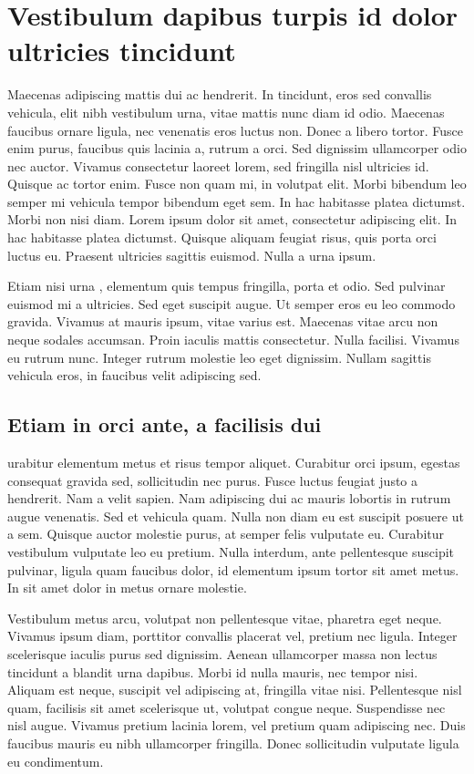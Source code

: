 \chapter{Vestibulum dapibus turpis id dolor ultricies tincidunt}

Maecenas adipiscing mattis dui ac hendrerit. In tincidunt, eros sed convallis vehicula, elit nibh vestibulum urna, vitae mattis nunc diam id odio. Maecenas faucibus ornare ligula, nec venenatis eros luctus non. Donec a libero tortor. Fusce enim purus, faucibus quis lacinia a, rutrum a orci. Sed dignissim ullamcorper odio nec auctor. Vivamus consectetur laoreet lorem, sed fringilla nisl ultricies id. Quisque ac tortor enim. Fusce non quam mi, in volutpat elit. Morbi bibendum leo semper mi vehicula tempor bibendum eget sem. In hac habitasse platea dictumst. Morbi non nisi diam. Lorem ipsum dolor sit amet, consectetur adipiscing elit. In hac habitasse platea dictumst. Quisque aliquam feugiat risus, quis porta orci luctus eu. Praesent ultricies sagittis euismod. Nulla a urna ipsum.

Etiam nisi urna \cite{doe2016}, elementum quis tempus fringilla, porta et odio. Sed pulvinar euismod mi a ultricies. Sed eget suscipit augue. Ut semper eros eu leo commodo gravida. Vivamus at mauris ipsum, vitae varius est. Maecenas vitae arcu non neque sodales accumsan. Proin iaculis mattis consectetur. Nulla facilisi. Vivamus eu rutrum nunc. Integer rutrum molestie leo eget dignissim. Nullam sagittis vehicula eros, in faucibus velit adipiscing sed.

\section{Etiam in orci ante, a facilisis dui}
urabitur elementum metus et risus tempor aliquet. Curabitur orci ipsum, egestas consequat gravida sed, sollicitudin nec purus. Fusce luctus feugiat justo a hendrerit. Nam a velit sapien. Nam adipiscing dui ac mauris lobortis in rutrum augue venenatis. Sed et vehicula quam. Nulla non diam eu est suscipit posuere ut a sem. Quisque auctor molestie purus, at semper felis vulputate eu. Curabitur vestibulum vulputate leo eu pretium. Nulla interdum, ante pellentesque suscipit pulvinar, ligula quam faucibus dolor, id elementum ipsum tortor sit amet metus. In sit amet dolor in metus ornare molestie.

Vestibulum metus arcu, volutpat non pellentesque vitae, pharetra eget neque. Vivamus ipsum diam, porttitor convallis placerat vel, pretium nec ligula. Integer scelerisque iaculis purus sed dignissim. Aenean ullamcorper massa non lectus tincidunt a blandit urna dapibus. Morbi id nulla mauris, nec tempor nisi. Aliquam est neque, suscipit vel adipiscing at, fringilla vitae nisi. Pellentesque nisl quam, facilisis sit amet scelerisque ut, volutpat congue neque. Suspendisse nec nisl augue. Vivamus pretium lacinia lorem, vel pretium quam adipiscing nec. Duis faucibus mauris eu nibh ullamcorper fringilla. Donec sollicitudin vulputate ligula eu condimentum.

